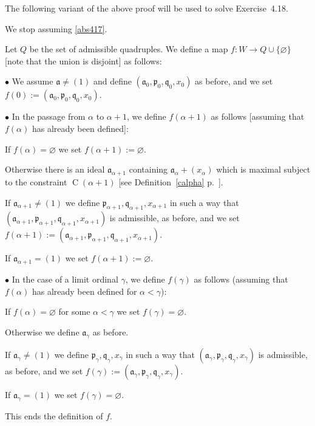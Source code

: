 \documentclass[12pt,letterpaper]{article}%
\newcommand{\oo}{\operatorname}\newcommand{\ooo}{\operatorname*}
\newcommand{\mf}{\mathfrak}
\newcommand{\aaa}{\mf a}
\newcommand{\ppp}{\mf p}
\newcommand{\qqq}{\mf q}
\newcommand{\bu}{\bullet}
\newcommand{\nn}{\noindent}
\begin{document}
The following variant of the above proof will be used to solve Exercise~4.18. 

We stop assuming \eqref{abs417}. 

Let $Q$ be the set of admissible quadruples. We define a map $f:W\to Q\cup\{\varnothing\}$ [note that the union is disjoint] as follows:

\nn$\bu$ We assume $\aaa\ne(1)$ and define $(\aaa_0,\ppp_0,\qqq_0,x_0)$ as before, and we set $f(0):=(\aaa_0,\ppp_0,\qqq_0,x_0)$. 

\nn$\bu$ In the passage from $\alpha$ to $\alpha+1$, we define $f(\alpha+1)$ as follows [assuming that $f(\alpha)$ has already been defined]:

If $f(\alpha)=\varnothing$ we set $f(\alpha+1):=\varnothing$. 

Otherwise there is an ideal $\aaa_{\alpha+1}$ containing $\aaa_\alpha+(x_\alpha)$ which is maximal subject to the constraint $\oo C(\alpha+1)$ [see Definition~\ref{calpha} p.~\pageref{calpha}]. 

If $\aaa_{\alpha+1}\ne(1)$ we define $\ppp_{\alpha+1},\qqq_{\alpha+1},x_{\alpha+1}$ in such a way that $(\aaa_{\alpha+1},\ppp_{\alpha+1},\qqq_{\alpha+1},x_{\alpha+1})$ is admissible, as before, and we set $f(\alpha+1):=(\aaa_{\alpha+1},\ppp_{\alpha+1},\qqq_{\alpha+1},x_{\alpha+1})$.  

If $\aaa_{\alpha+1}=(1)$ we set $f(\alpha+1):=\varnothing$.

\nn$\bu$ In the case of a limit ordinal $\gamma$, we define $f(\gamma)$ as follows (assuming that $f(\alpha)$ has already been defined for $\alpha<\gamma$):

If $f(\alpha)=\varnothing$ for some $\alpha<\gamma$ we set $f(\gamma)=\varnothing$.

Otherwise we define $\aaa_\gamma$ as before.

If $\aaa_\gamma\ne(1)$ we define $\ppp_\gamma,\qqq_\gamma,x_\gamma$ in such a way that $(\aaa_\gamma,\ppp_\gamma,\qqq_\gamma,x_\gamma)$ is admissible, as before, and we set $f(\gamma):=(\aaa_{\gamma},\ppp_{\gamma},\qqq_{\gamma},x_{\gamma})$.  

If $\aaa_\gamma=(1)$ we set $f(\gamma)=\varnothing$.

This ends the definition of $f$.
\end{document}
